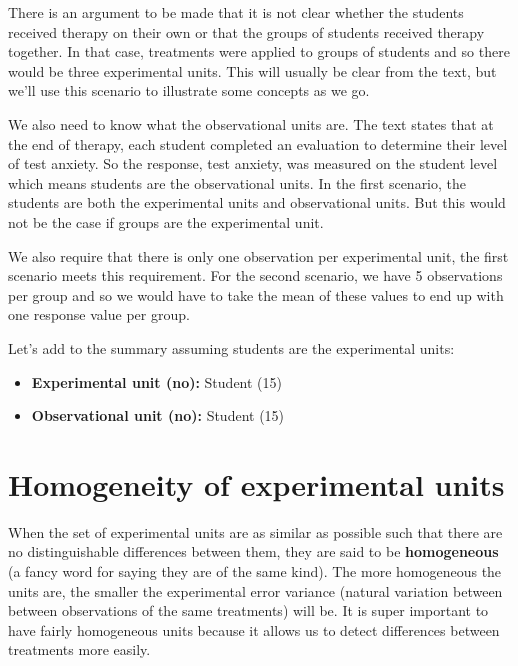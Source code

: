 \documentclass[
  letterpaper,
  DIV=11,
  numbers=noendperiod,
  oneside]{scrreprt}
\providecommand{\tightlist}{%
  \setlength{\itemsep}{0pt}\setlength{\parskip}{0pt}}\usepackage{longtable,booktabs,array}
\begin{document}
There is an argument to be made that it is not clear whether the
students received therapy on their own or that the groups of students
received therapy together. In that case, treatments were applied to
groups of students and so there would be three experimental units. This
will usually be clear from the text, but we'll use this scenario to
illustrate some concepts as we go.

We also need to know what the observational units are. The text states
that at the end of therapy, each student completed an evaluation to
determine their level of test anxiety. So the response, test anxiety,
was measured on the student level which means students are the
observational units. In the first scenario, the students are both the
experimental units and observational units. But this would not be the
case if groups are the experimental unit.

We also require that there is only one observation per experimental
unit, the first scenario meets this requirement. For the second
scenario, we have 5 observations per group and so we would have to take
the mean of these values to end up with one response value per group.

Let's add to the summary assuming students are the experimental units:

\begin{itemize}
\tightlist
\item
  \textbf{Experimental unit (no):} Student (15)\\
\item
  \textbf{Observational unit (no):} Student (15)
\end{itemize}

\section*{\texorpdfstring{\textbf{Homogeneity of experimental
units}}{Homogeneity of experimental units}}\label{homogeneity-of-experimental-units}


When the set of experimental units are as similar as possible such that
there are no distinguishable differences between them, they are said to
be \textbf{homogeneous} (a fancy word for saying they are of the same
kind). The more homogeneous the units are, the smaller the experimental
error variance (natural variation between between observations of the
same treatments) will be. It is super important to have fairly
homogeneous units because it allows us to detect differences between
treatments more easily.
\end{document}
